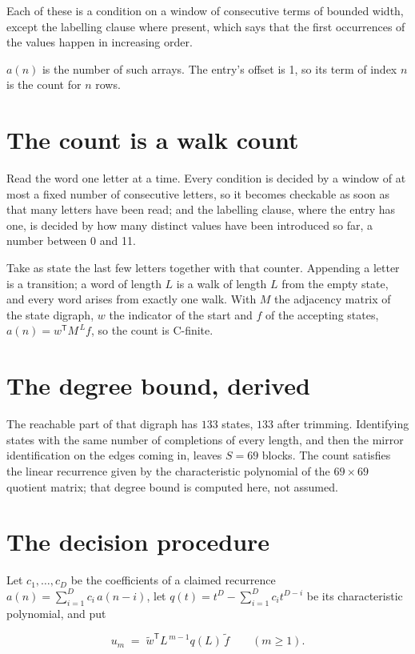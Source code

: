 \documentclass[11pt]{article}
\theoremstyle{definition}
\begin{document}
Each of these is a condition on a window of consecutive terms of bounded width, except the labelling clause where present, which says that the first occurrences of the values happen in increasing order.

$a(n)$ is the number of such arrays. The entry's offset is 1, so its term of index $n$ is the count for $n$ rows.

\section{The count is a walk count}

Read the word one letter at a time. Every condition is decided by a window of at most a fixed number of consecutive letters, so it becomes checkable as soon as that many letters have been read; and the labelling clause, where the entry has one, is decided by how many distinct values have been introduced so far, a number between $0$ and 11.

Take as state the last few letters together with that counter. Appending a letter is a transition; a word of length $L$ is a walk of length $L$ from the empty state, and every word arises from exactly one walk. With $M$ the adjacency matrix of the state digraph, $w$ the indicator of the start and $f$ of the accepting states, $a(n) = w^{\mathsf T}M^{\,L}f$, so the count is C-finite.

\section{The degree bound, derived}

The reachable part of that digraph has $133$ states, $133$ after trimming. Identifying states with the same number of completions of every length, and then the mirror identification on the edges coming in, leaves $S = 69$ blocks. The count satisfies the linear recurrence given by the characteristic polynomial of the $69\times69$ quotient matrix; that degree bound is computed here, not assumed.

\section{The decision procedure}

Let $c_1,\dots,c_D$ be the coefficients of a claimed recurrence $a(n) = \sum_{i=1}^{D} c_i\,a(n-i)$, let $q(t) = t^{D} - \sum_{i=1}^{D} c_i t^{D-i}$ be its characteristic polynomial, and put

\[u_m \;=\; \tilde w^{\mathsf T} L^{\,m-1} q(L)\,\tilde f \qquad (m \ge 1).\]
\end{document}
